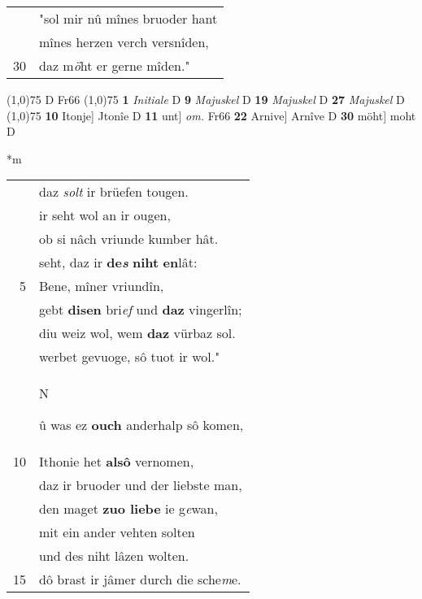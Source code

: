 \documentclass[8pt,a4paper,notitlepage]{article}
\begin{document}
\begin{table}[ht]
\begin{minipage}[t]{0.5\linewidth}
\begin{tabular}{rl}
 & "sol mir nû mînes bruoder hant\\ 
 & mînes herzen verch versnîden,\\ 
30 & daz m\textit{ö}ht er gerne mîden."\\ 
\end{tabular}
\scriptsize
\line(1,0){75} \newline
D Fr66 \newline
\line(1,0){75} \newline
\textbf{1} \textit{Initiale} D  \textbf{9} \textit{Majuskel} D  \textbf{19} \textit{Majuskel} D  \textbf{27} \textit{Majuskel} D  \newline
\line(1,0){75} \newline
\textbf{10} Itonje] Jtonîe D \textbf{11} unt] \textit{om.} Fr66 \textbf{22} Arnive] Arnîve D \textbf{30} möht] moht D \newline
\end{minipage}
\hspace{0.5cm}
\begin{minipage}[t]{0.5\linewidth}
\small
\begin{center}*m
\end{center}
\begin{tabular}{rl}
 & daz \textit{solt} ir brüefen tougen.\\ 
 & ir seht wol an ir ougen,\\ 
 & ob si nâch vriunde kumber hât.\\ 
 & seht, daz ir \textbf{de\textit{s}} \textbf{niht} \textbf{en}lât:\\ 
5 & Bene, mîner vriundîn,\\ 
 & gebt \textbf{disen} bri\textit{ef} und \textbf{daz} vingerlîn;\\ 
 & diu weiz wol, wem \textbf{daz} vürbaz sol.\\ 
 & werbet gevuoge, sô tuot ir wol."\\ 
 & \begin{large}N\end{large}û was ez \textbf{ouch} anderhalp sô komen,\\ 
10 & Ithonie het \textbf{alsô} vernomen,\\ 
 & daz ir bruoder und der liebste man,\\ 
 & den maget \textbf{zuo liebe} ie g\textit{e}wan,\\ 
 & mit ein ander vehten solten\\ 
 & und des niht lâzen wolten.\\ 
15 & dô brast ir jâmer durch die sche\textit{m}e.\\ 

\end{tabular}
\end{minipage}
\end{table}
\end{document}

